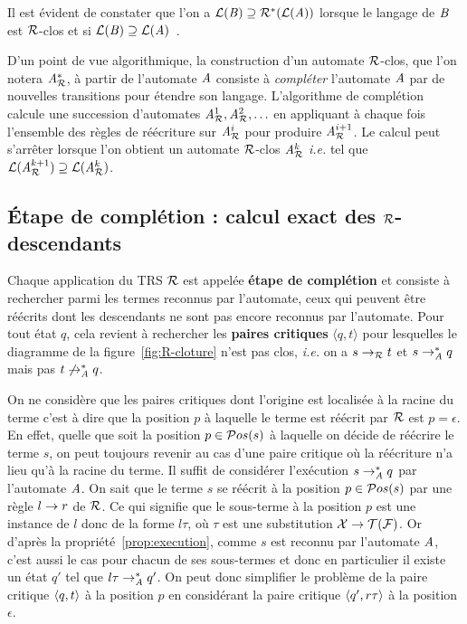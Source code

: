 Il est évident de constater que l'on a $\mathcal{L}(\mathit B) \supseteq \mathcal R^*(\mathcal{L}(\mathit A))$
lorsque le langage de $\mathit B$ est $\mathcal R$-clos et si $\mathcal{L}(\mathit B)\supseteq \mathcal{L}(\mathit A)$~\cite{BoyerGJ-IJCAR08}.

D'un point de vue algorithmique, la construction d'un automate $\mathcal R$-clos, que l'on notera
${\mathit A}_{\mathcal R}^*$, à partir de l'automate $\mathit A$ consiste à \textit{compléter} l'automate $\mathit A$
par de nouvelles transitions pour étendre son langage. L'algorithme de complétion
calcule une succession d'automates ${\mathit A}_{\mathcal R}^1,{\mathit A}_{\mathcal R}^2,\ldots$ en appliquant à chaque fois
l'ensemble des règles de réécriture sur ${\mathit A}_{\mathcal R}^i$ pour produire ${\mathit A}_{\mathcal R}^{i+1}$.
Le calcul peut s'arrêter lorsque l'on obtient un automate $\mathcal R$-clos 
${\mathit A}_{\mathcal R}^k$ \textit{i.e.} tel que $\mathcal{L}({\mathit A}_{\mathcal R}^{k+1}) \supseteq \mathcal{L}({\mathit A}_{\mathcal R}^k)$.

\subsection{Étape de complétion : calcul exact des $\mathcal R$-descendants}


Chaque application du TRS $\mathcal R$  est appelée \textbf{étape de complétion} et 
consiste à rechercher parmi les termes reconnus par l'automate, ceux qui peuvent être réécrits
dont les descendants ne sont pas encore reconnus par l'automate.
Pour tout état $q$, cela revient à rechercher les \textbf{paires critiques} $\langle q, t \rangle$ 
pour lesquelles le diagramme de la figure~\ref{fig:R-cloture} n'est pas clos, \textit{i.e.}
on a $s \rightarrow_\mathcal R t$ et $s \rightarrow_{\mathit A}^* q$ mais pas $t \not\rightarrow_{\mathit A}^* q$.

On ne considère que les paires critiques dont l'origine est localisée à la racine du terme c'est à dire
que la position $p$ à laquelle le terme est réécrit par $\mathcal R$ est $p = \epsilon$.
En effet, quelle que soit la position $p \in \mathcal{ P}os(s)$ à laquelle on décide de réécrire le terme
$s$, on peut toujours revenir au cas d'une paire critique où la réécriture n'a lieu qu'à la racine du terme.
Il suffit de considérer l'exécution $s \rightarrow_\mathit A^* q$ par l'automate $\mathit A$. 
On sait que le terme $s$ se réécrit à la position $p \in \mathcal{ P}os(s)$ par une règle $l \rightarrow r$ de $\mathcal R$. Ce qui signifie que le sous-terme à la 
position $p$ est une instance de $l$ donc de la forme $l\tau$, où $\tau$ est une substitution $\mathcal X \rightarrow \mathcal{T(F)}$.
Or d'après la propriété~\ref{prop:execution}, comme $s$ est reconnu par l'automate $\mathit A$, c'est aussi le cas pour chacun de ses sous-termes
et donc en particulier il existe un état $q'$ tel que $l\tau \rightarrow_\mathit A^* q'$. On peut donc simplifier le problème de la paire critique $\langle q, t\rangle$ à la position $p$
en considérant la paire critique $\langle q', r\tau\rangle$ à la position $\epsilon$.



